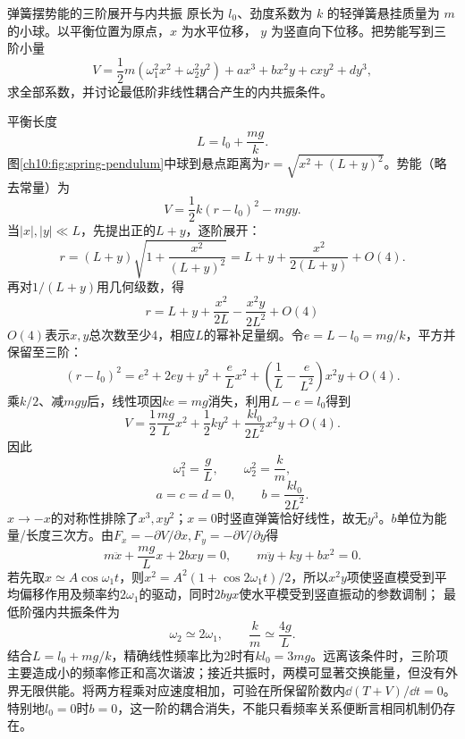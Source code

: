 \begin{origexamplebox}{弹簧摆势能的三阶展开与内共振}\label{ch10:ex:spring-pendulum}
原长为 $l_0$、劲度系数为 $k$ 的轻弹簧悬挂质量为 $m$ 的小球。以平衡位置为原点，$x$ 为水平位移，
$y$ 为竖直向下位移。把势能写到三阶小量
\[
 V=\frac12m(\omega_1^2x^2+\omega_2^2y^2)
 +ax^3+bx^2y+cxy^2+dy^3,
\]
求全部系数，并讨论最低阶非线性耦合产生的内共振条件。
\end{origexamplebox}
\begin{xesolution}
平衡长度
\[
 L=l_0+\frac{mg}{k}.
\]
图\ref{ch10:fig:spring-pendulum}中球到悬点距离为$r=\sqrt{x^2+(L+y)^2}$。势能（略去常量）为
\[
 V=\frac12k(r-l_0)^2-mgy.
\]
\chTenSpringPendulumFigure
当$|x|,|y|\ll L$，先提出正的$L+y$，逐阶展开：
\[
 r=(L+y)\sqrt{1+\frac{x^2}{(L+y)^2}}
 =L+y+\frac{x^2}{2(L+y)}+O(4).
\]
再对$1/(L+y)$用几何级数，得
\[
 r=L+y+\frac{x^2}{2L}-\frac{x^2y}{2L^2}+O(4)
\]
$O(4)$表示$x,y$总次数至少4，相应$L$的幂补足量纲。令$e=L-l_0=mg/k$，平方并保留至三阶：
\[
 (r-l_0)^2=e^2+2ey+y^2+\frac eLx^2
 +\left(\frac1L-\frac e{L^2}\right)x^2y+O(4).
\]
乘$k/2$、减$mgy$后，线性项因$ke=mg$消失，利用$L-e=l_0$得到
\[
 V=\frac12\frac{mg}{L}x^2+\frac12ky^2
 +\frac{kl_0}{2L^2}x^2y+O(4).
\]
因此
\[
 \boxed{\omega_1^2=\frac gL},\qquad
 \boxed{\omega_2^2=\frac km},
\]
\[
 \boxed{a=c=d=0},\qquad
 \boxed{b=\frac{kl_0}{2L^2}}.
\]
$x\to-x$的对称性排除了$x^3,xy^2$；$x=0$时竖直弹簧恰好线性，故无$y^3$。$b$单位为能量/长度三次方。由$F_x=-\partial V/\partial x,F_y=-\partial V/\partial y$得
\[
 m\ddot x+\frac{mg}{L}x+2bxy=0,\qquad
 m\ddot y+ky+bx^2=0.
\]
若先取$x\simeq A\cos\omega_1t$，则$x^2=A^2(1+\cos2\omega_1t)/2$，所以$x^2y$项使竖直模受到平均偏移作用及频率约$2\omega_1$的驱动，同时$2byx$使水平模受到竖直振动的参数调制；
最低阶强内共振条件为
\[
 \boxed{\omega_2\simeq2\omega_1},\qquad
 \frac{k}{m}\simeq\frac{4g}{L}.
\]
结合$L=l_0+mg/k$，精确线性频率比为2时有$kl_0=3mg$。远离该条件时，三阶项主要造成小的频率修正和高次谐波；接近共振时，两模可显著交换能量，但没有外界无限供能。将两方程乘对应速度相加，可验在所保留阶数内$\dd(T+V)/\dd t=0$。特别地$l_0=0$时$b=0$，这一阶的耦合消失，不能只看频率关系便断言相同机制仍存在。
\end{xesolution}
